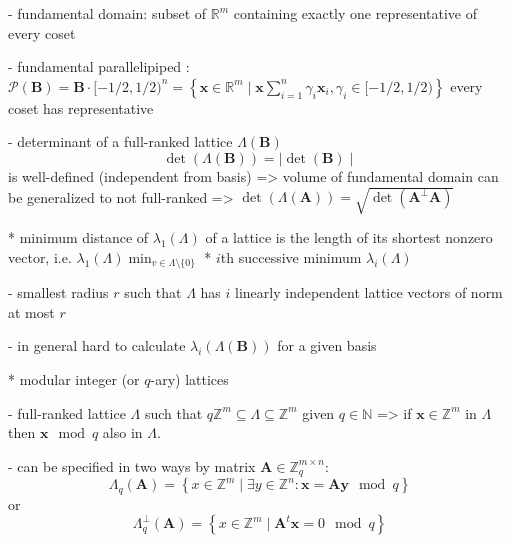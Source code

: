 \documentclass[
  a4paper,  %
  twoside,  %
  bibliography=totoc,
  headsepline,
  cleardoublepage=empty,
  parskip=half,
  draft=false
]{scrbook}
\begin{document}
    - fundamental domain: subset of $\mathbb{R}^m$ containing exactly one representative of every coset

    - fundamental parallelipiped \label{eq:fundamental-parallelipiped}: $\mathcal{P}(\textbf{B}) = \textbf{B} \cdot [ - 1/2, 1/2)^n = \left\{ \textbf{x} \in \mathbb{R}^m \mid \textbf{x} \sum_{i=1}^n \gamma_i \textbf{x}_i, \gamma_i \in  [ - 1/2, 1/2) \right\}$ every coset has representative  %

    - determinant of a full-ranked lattice $\Lambda(\textbf{B})$
    \begin{equation}
      \det(\Lambda(\textbf{B})) = \mid \det(\textbf{B})\mid
    \end{equation}
      is well-defined (independent from basis) => volume of fundamental domain %
      can be generalized to not full-ranked => $\det(\Lambda(\textbf{A})) = \sqrt{\det(\textbf{A}^\perp \textbf{A})}$

  * minimum distance of $\lambda_1(\Lambda)$ of a lattice is the length of its shortest nonzero vector, i.e. $\lambda_1(\Lambda) \min_{v \in \Lambda \setminus \{0\}}$
  * $i$th successive minimum $\lambda_i(\Lambda)$

    - smallest radius $r$ such that $\Lambda$ has $i$ linearly independent lattice vectors of norm at most $r$

    - in general hard to calculate $\lambda_i(\Lambda(\textbf{B}))$ for a given basis  
  
  * modular integer (or $q$-ary) lattices %

    - full-ranked lattice $\Lambda$ such that $q\mathbb{Z}^m \subseteq	\Lambda \subseteq	\mathbb{Z}^m$ given $q \in \mathbb{N}$ => if $\textbf{x} \in \mathbb{Z}^m$ in $\Lambda$ then $\textbf{x} \mod q$ also in $\Lambda$. 

    - can be specified in two ways by matrix $\textbf{A} \in \mathbb{Z}_q^{m\times n}$: %
    \begin{equation}
      \Lambda_q(\textbf{A}) = \left\{ x \in \mathbb{Z}^m \mid \exists y \in \mathbb{Z}^n : \textbf{x} = \textbf{A}\textbf{y} \mod q \right\}
    \end{equation}
    or
    \begin{equation}
      \Lambda_q^\perp(\textbf{A}) = \left\{ x \in \mathbb{Z}^m \mid  \textbf{A}^t\textbf{x} = 0 \mod q \right\}
    \end{equation}
\end{document}
